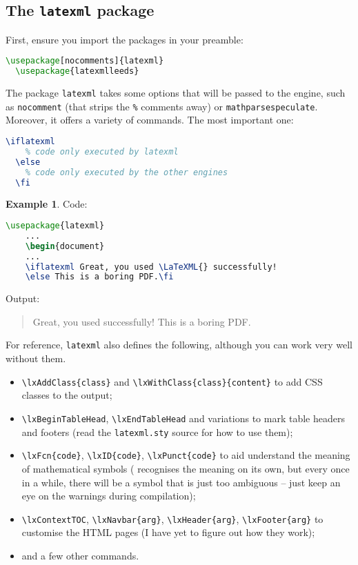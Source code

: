 \documentclass[a4paper]{article}
\theoremstyle{definition}
\newtheorem{exa}{Example}[subsection]
\begin{document}
\subsection{The \texttt{latexml} package}
First, ensure you import the packages in your preamble:
\begin{lstlisting}[language=TeX,caption={Import packages in the preamble}]
  \usepackage[nocomments]{latexml}
  \usepackage{latexmlleeds}
\end{lstlisting}

The package \verb|latexml| takes some options that will be passed to the \LaTeXML{} engine, such as \verb|nocomment| (that strips the \verb|%| comments away) or \verb|mathparsespeculate|. Moreover, it offers a variety of commands. The most important one:
\begin{lstlisting}[language=TeX]
  \iflatexml
    % code only executed by latexml
  \else
    % code only executed by the other engines
  \fi
\end{lstlisting}

\begin{exa}
  Code:
  \begin{lstlisting}[language=TeX]
    \usepackage{latexml}
    ...
    \begin{document}
    ...
    \iflatexml Great, you used \LaTeXML{} successfully!
    \else This is a boring PDF.\fi
  \end{lstlisting}
  Output:
  \begin{quote}
    \iflatexml Great, you used \LaTeXML{} successfully!
    \else This is a boring PDF.\fi
  \end{quote}
\end{exa}

For reference, \verb|latexml| also defines the following, although you can work very well without them.
\begin{itemize}
  \item \verb|\lxAddClass{class}| and \verb|\lxWithClass{class}{content}| to add CSS classes to the output;
  \item \verb|\lxBeginTableHead|, \verb|\lxEndTableHead| and variations to mark table headers and footers (read the \verb|latexml.sty| source for how to use them);
  \item \verb|\lxFcn{code}|, \verb|\lxID{code}|, \verb|\lxPunct{code}| to aid \LaTeXML{} understand the meaning of mathematical symbols (\LaTeXML{} recognises the meaning on its own, but every once in a while, there will be a symbol that is just too ambiguous -- just keep an eye on the warnings during compilation);
  \item \verb|\lxContextTOC|, \verb|\lxNavbar{arg}|, \verb|\lxHeader{arg}|, \verb|\lxFooter{arg}| to customise the HTML pages (I have yet to figure out how they work);
  \item and a few other commands.
\end{itemize}
\end{document}
